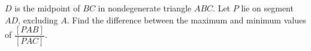 $D$ is the midpoint of $BC$ in nondegenerate triangle $ABC$. Let $P$ lie on segment $AD$, excluding $A$. Find the difference between the maximum and minimum values of $\dfrac{[PAB]}{[PAC]}$.
